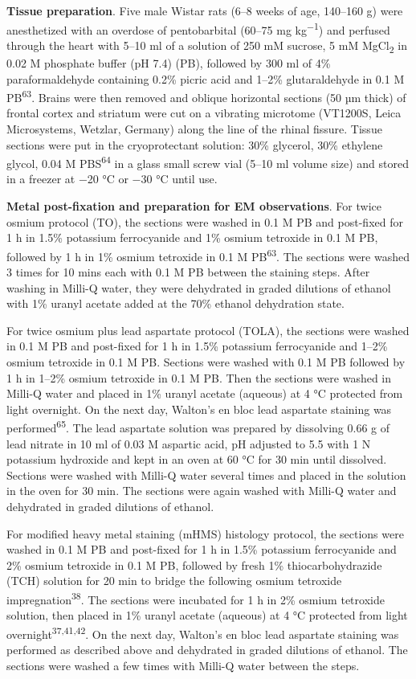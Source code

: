 \documentclass{article}
\begin{document}
\textbf{Tissue preparation}. Five male Wistar rats (6–8 weeks of age, 140–160 g) were anesthetized with an overdose of pentobarbital (60–75 mg kg\textsuperscript{−1}) and perfused through the heart with 5–10 ml of a solution of 250 mM sucrose, 5 mM MgCl\textsubscript{2} in 0.02 M phosphate buffer (pH 7.4) (PB), followed by 300 ml of 4\% paraformaldehyde containing 0.2\% picric acid and 1–2\% glutaraldehyde in 0.1 M PB\textsuperscript{63}. Brains were then removed and oblique horizontal sections (50 µm thick) of frontal cortex and striatum were cut on a vibrating microtome (VT1200S, Leica Microsystems, Wetzlar, Germany) along the line of the rhinal fissure. Tissue sections were put in the cryoprotectant solution: 30\% glycerol, 30\% ethylene glycol, 0.04 M PBS\textsuperscript{64} in a glass small screw vial (5–10 ml volume size) and stored in a freezer at −20 °C or −30 °C until use.

\textbf{Metal post-fixation and preparation for EM observations}. For twice osmium protocol (TO), the sections were washed in 0.1 M PB and post-fixed for 1 h in 1.5\% potassium ferrocyanide and 1\% osmium tetroxide in 0.1 M PB, followed by 1 h in 1\% osmium tetroxide in 0.1 M PB\textsuperscript{63}. The sections were washed 3 times for 10 mins each with 0.1 M PB between the staining steps. After washing in Milli-Q water, they were dehydrated in graded dilutions of ethanol with 1\% uranyl acetate added at the 70\% ethanol dehydration state.

For twice osmium plus lead aspartate protocol (TOLA), the sections were washed in 0.1 M PB and post-fixed for 1 h in 1.5\% potassium ferrocyanide and 1–2\% osmium tetroxide in 0.1 M PB. Sections were washed with 0.1 M PB followed by 1 h in 1–2\% osmium tetroxide in 0.1 M PB. Then the sections were washed in Milli-Q water and placed in 1\% uranyl acetate (aqueous) at 4 °C protected from light overnight. On the next day, Walton’s en bloc lead aspartate staining was performed\textsuperscript{65}. The lead aspartate solution was prepared by dissolving 0.66 g of lead nitrate in 10 ml of 0.03 M aspartic acid, pH adjusted to 5.5 with 1 N potassium hydroxide and kept in an oven at 60 °C for 30 min until dissolved. Sections were washed with Milli-Q water several times and placed in the solution in the oven for 30 min. The sections were again washed with Milli-Q water and dehydrated in graded dilutions of ethanol.

For modified heavy metal staining (mHMS) histology protocol, the sections were washed in 0.1 M PB and post-fixed for 1 h in 1.5\% potassium ferrocyanide and 2\% osmium tetroxide in 0.1 M PB, followed by fresh 1\% thiocarbohydrazide (TCH) solution for 20 min to bridge the following osmium tetroxide impregnation\textsuperscript{38}. The sections were incubated for 1 h in 2\% osmium tetroxide solution, then placed in 1\% uranyl acetate (aqueous) at 4 °C protected from light overnight\textsuperscript{37,41,42}. On the next day, Walton’s en bloc lead aspartate staining was performed as described above and dehydrated in graded dilutions of ethanol. The sections were washed a few times with Milli-Q water between the steps.
\end{document}
